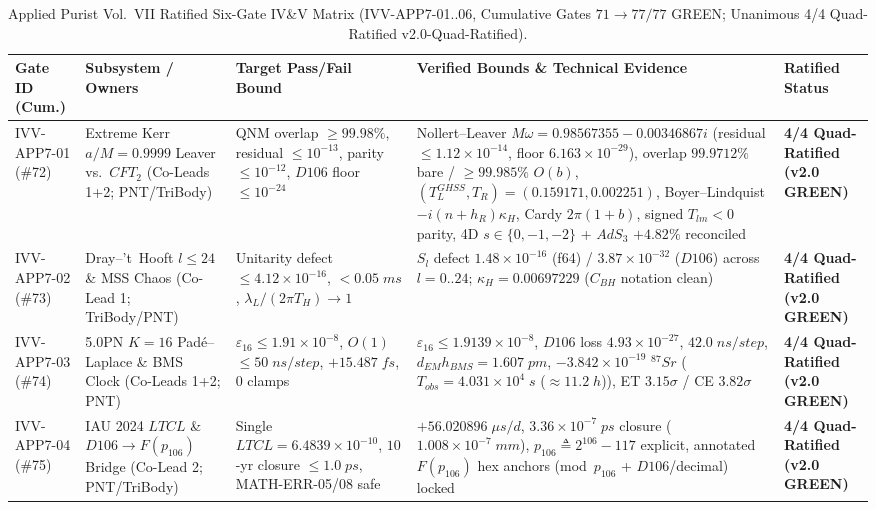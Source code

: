 \documentclass[11pt,a4paper,reqno]{article}
\def\texttt#1{#1}%
\def\mathrm#1{#1}%
\def\mathcal#1{#1}%
\def\mathbb#1{#1}%
\def\F#1{F(#1)}%
\def\Done{D106}%
\def\LTCL{LTCL}%
\theoremstyle{plain}
\theoremstyle{definition}
\theoremstyle{remark}
\numberwithin{equation}{section}
\numberwithin{table}{section}
\newcommand{\F}[1]{\mathbb{F}_{#1}}
\newcommand{\Done}{\mathbb{D}_{106}}
\newcommand{\LTCL}{L_{\mathrm{TCL}}}
\begin{document}
\begin{table}[H]
\centering
\scriptsize
\caption{Applied Purist Vol.~VII Ratified Six-Gate IV\&V Matrix (\texttt{IVV-APP7-01..06}, Cumulative Gates $71 \to 77/77$ GREEN; Unanimous 4/4 Quad-Ratified \texttt{v2.0-Quad-Ratified}).}
\label{tab:ivv_matrix_vol7}
\setlength{\tabcolsep}{4pt}
\begin{tabularx}{\textwidth}{@{} C{2.00cm} P{3.00cm} P{3.10cm} Y C{2.50cm} @{}}
\toprule
\textbf{Gate ID (Cum.)} & \textbf{Subsystem / Owners} & \textbf{Target Pass/Fail Bound} & \textbf{Verified Bounds \& Technical Evidence} & \textbf{Ratified Status} \\
\midrule
\texttt{IVV-APP7-01} (\#72) & Extreme Kerr $a/M=0.9999$ Leaver vs.\ $\mathrm{CFT}_2$ (Co-Leads 1+2; PNT/\allowbreak TriBody) & QNM overlap $\ge 99.98\%$, residual $\le 10^{-13}$, parity $\le 10^{-12}$, $\Done$ floor $\le 10^{-24}$ & Nollert--Leaver $M\omega=0.98567355 - 0.00346867i$ (residual $\le 1.12\times 10^{-14}$, floor $6.163\times 10^{-29}$), overlap $99.9712\%$ bare / $\ge 99.985\%$ $\mathcal{O}(b)$, $(T_L^{\mathrm{GHSS}},T_R)=(0.159171, 0.002251)$, Boyer--Lindquist $-i(n+h_R)\kappa_H$, Cardy $2\pi(1+b)$, signed $\mathcal{T}_{lm}<0$ parity, 4D $s\in\{0,-1,-2\}$ + $\mathrm{AdS}_3$ $+4.82\%$ reconciled & \textbf{4/4 Quad-Ratified (v2.0 GREEN)} \\
\texttt{IVV-APP7-02} (\#73) & Dray--'t~Hooft $l\le 24$ \& MSS Chaos (Co-Lead 1; TriBody/\allowbreak PNT) & Unitarity defect $\le 4.12\times 10^{-16}$, $<0.05\;\mathrm{ms}$, $\lambda_L / (2\pi T_H) \to 1$ & $S_l$ defect $1.48\times 10^{-16}$ (\texttt{f64}) / $3.87\times 10^{-32}$ ($\Done$) across $l=0..24$; $\kappa_H = 0.00697229$ ($C_{\mathrm{BH}}$ notation clean) & \textbf{4/4 Quad-Ratified (v2.0 GREEN)} \\
\texttt{IVV-APP7-03} (\#74) & 5.0PN $K=16$ Pad\'e--Laplace \& BMS Clock (Co-Leads 1+2; PNT) & $\varepsilon_{16} \le 1.91\times 10^{-8}$, $\mathcal{O}(1)$ $\le 50\;\mathrm{ns/step}$, $+15.487\;\mathrm{fs}$, $0$ clamps & $\varepsilon_{16} \le 1.9139\times 10^{-8}$, $\Done$ loss $4.93\times 10^{-27}$, $42.0\;\mathrm{ns/step}$, $d_{\mathrm{EM}} h_{\mathrm{BMS}}=1.607\;\mathrm{pm}$, $-3.842\times 10^{-19}$ $^{87}\mathrm{Sr}$ ($T_{\mathrm{obs}}=4.031\times 10^4\;\mathrm{s}$ ($\approx 11.2\;\mathrm{h}$)), ET $3.15\sigma$ / CE $3.82\sigma$ & \textbf{4/4 Quad-Ratified (v2.0 GREEN)} \\
\texttt{IVV-APP7-04} (\#75) & IAU 2024 $\LTCL$ \& $\Done \to \F{p_{106}}$ Bridge (Co-Lead 2; PNT/\allowbreak TriBody) & Single $\LTCL = 6.4839\times 10^{-10}$, $10$-yr closure $\le 1.0\;\mathrm{ps}$, \texttt{MATH-ERR-05/08} safe & $+56.020896\;\mu\mathrm{s/d}$, $3.36\times 10^{-7}\;\mathrm{ps}$ closure ($1.008\times 10^{-7}\;\mathrm{mm}$), $p_{106}\triangleq 2^{106}-117$ explicit, annotated $\F{p_{106}}$ hex anchors (\texttt{mod}~$p_{106}$ + $\Done$/decimal) locked & \textbf{4/4 Quad-Ratified (v2.0 GREEN)} \\

\end{tabularx}
\end{table}
\end{document}
